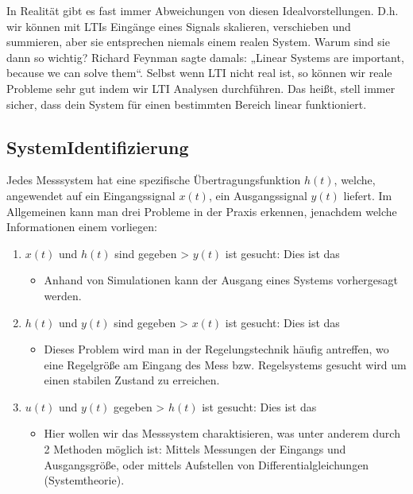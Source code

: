 \documentclass[letterpaper,10pt,english]{jupyterBook}
\begin{document}
\sphinxAtStartPar
In Realität gibt es fast immer Abweichungen von diesen Idealvorstellungen. D.h. wir können mit LTIs Eingänge eines Signals skalieren, verschieben und summieren, aber sie entsprechen niemals einem realen System. Warum sind sie dann so wichtig? Richard Feynman sagte damals: „Linear Systems are important, because we can solve them“.
Selbst wenn LTI nicht real ist, so können wir reale Probleme sehr gut  indem wir LTI Analysen durchführen.
Das heißt, stell immer sicher, dass dein System für einen bestimmten Bereich linear funktioniert.


\subsection{System\sphinxhyphen{}Identifizierung}
\label{\detokenize{content/5_LTI:system-identifizierung}}
\sphinxAtStartPar


\sphinxAtStartPar
Jedes Messsystem hat eine spezifische Übertragungsfunktion \(h(t)\), welche, angewendet auf ein Eingangssignal \(x(t)\), ein Ausgangssignal \(y(t)\) liefert. Im Allgemeinen kann man drei Probleme in der Praxis erkennen, jenachdem welche Informationen einem vorliegen:
\begin{enumerate}
%
\item {} 
\sphinxAtStartPar
\(x(t)\) und \(h(t)\) sind gegeben \sphinxhyphen{}> \(y(t)\) ist gesucht: Dies ist das 
\begin{itemize}
\item {} 
\sphinxAtStartPar
Anhand von Simulationen kann der Ausgang eines Systems vorhergesagt werden.

\end{itemize}

\item {} 
\sphinxAtStartPar
\(h(t)\) und \(y(t)\) sind gegeben \sphinxhyphen{}> \(x(t)\) ist gesucht: Dies ist das 
\begin{itemize}
\item {} 
\sphinxAtStartPar
Dieses Problem wird man in der Regelungstechnik häufig antreffen, wo eine Regelgröße am Eingang des Mess\sphinxhyphen{} bzw. Regelsystems gesucht wird um einen stabilen Zustand zu erreichen.

\end{itemize}

\item {} 
\sphinxAtStartPar
\(u(t)\) und \(y(t)\) gegeben \sphinxhyphen{}> \(h(t)\) ist gesucht: Dies ist das 
\begin{itemize}
\item {} 
\sphinxAtStartPar
Hier wollen wir das Messsystem charaktisieren, was unter anderem durch 2 Methoden möglich ist: Mittels Messungen der Eingangs\sphinxhyphen{} und Ausgangsgröße, oder mittels Aufstellen von Differentialgleichungen (Systemtheorie).

\end{itemize}

\end{enumerate}
\end{document}
